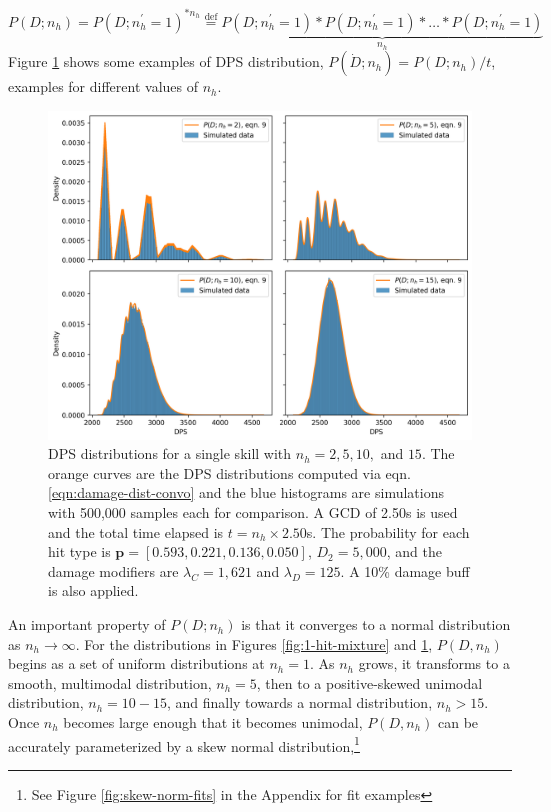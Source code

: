 \documentclass{article}
\begin{document}
    \begin{equation}\label{eqn:damage-dist-convo}
        P(D;n_h) = P(D;n_h^\prime=1)^{\ast n_h} \stackrel{\text{def}}{=} \underbrace{P(D; n_h^\prime = 1) \ast P(D; n_h^\prime = 1) \ast\dots\ast P(D; n_h^\prime = 1)}_{n_h}
    \end{equation}
    Figure \ref{fig:convo-convergence} shows some examples of DPS distribution, $P(\dot{D}; n_h) = P(D; n_h) / t$, examples for different values of $n_{h}$.
    \begin{figure}[H]
        \centering
        \includegraphics[width=0.95\linewidth]{img/convo-convergence.png}
        \caption{DPS distributions for a single skill with $n_{h} = 2, 5, 10,$ and $15$. The orange curves are the DPS distributions computed via eqn. \ref{eqn:damage-dist-convo} and the blue histograms are simulations with 500,000 samples each for comparison. A GCD of 2.50s is used and the total time elapsed is $t = n_h \times 2.50$s. The probability for each hit type is $\textbf{p} = [0.593, 0.221, 0.136, 0.050]$, $D_2 = 5,000$, and the damage modifiers are $\lambda_C = 1,621$ and $\lambda_D = 125$. A 10\% damage buff is also applied.}\label{fig:convo-convergence}
    \end{figure}
    An important property of $P(D; n_h)$ is that it converges to a normal distribution as $n_h \rightarrow \infty$. For the distributions in Figures \ref{fig:1-hit-mixture} and \ref{fig:convo-convergence}, $P(D, n_h)$ begins as a set of uniform distributions at $n_h = 1$. As $n_h$ grows, it transforms to a smooth, multimodal distribution, $n_h = 5$, then to a positive-skewed unimodal distribution, $n_h = 10 - 15$, and finally towards a normal distribution, $n_h > 15$. Once $n_h$ becomes large enough that it becomes unimodal, $P(D, n_h)$ can be accurately parameterized by a skew normal distribution,\footnote{See Figure \ref{fig:skew-norm-fits} in the Appendix for fit examples}
\end{document}
